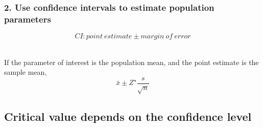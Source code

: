 \documentclass[slidestop,compress,mathserif,12pt,t,professionalfonts,xcolor=table]{beamer}
\begin{document}
\begin{frame}
\frametitle{2. Use confidence intervals to estimate population parameters}

\vfill

\[ CI: point~estimate \pm margin~of~error \]
$\:$ \\

\pause

If the parameter of interest is the population mean, and the point estimate is the sample mean,
\[ \bar{x} \pm Z^\star \frac{s}{\sqrt{n}} \]

\vfill


\end{frame}


\begin{frame}

\vfill


\vfill


\end{frame}


\subsection{Critical value depends on the confidence level}
\label{mi3}

\end{document}
